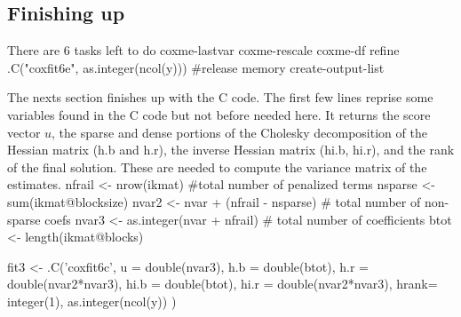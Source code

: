 \documentclass{article}
\begin{document}
\subsection{Finishing up}
\label{sect:final}
There are 6 tasks left to do
\nwenddocs{}\endmoddef
\LA{}coxme-lastvar\RA{}
\LA{}coxme-rescale\RA{}
\LA{}coxme-df\RA{}
\LA{}refine\RA{}  
.C("coxfit6e", as.integer(ncol(y)))  #release memory
\LA{}create-output-list\RA{}
\nwendcode{}\nwdocspar

The nexts section finishes up with the C code.
The first few lines reprise some variables
found in the C code but not before needed here.
It returns the score vector $u$, the 
sparse and dense portions of the Cholesky decomposition of the
Hessian matrix (h.b and h.r), the
inverse Hessian matrix (hi.b, hi.r), and the rank of the final 
solution.  These are needed to compute the variance matrix of the
estimates.
\nwenddocs{}\endmoddef
nfrail <- nrow(ikmat)  #total number of penalized terms
nsparse <- sum(ikmat@blocksize)
nvar2  <- nvar + (nfrail - nsparse)  # total number of non-sparse coefs
nvar3  <- as.integer(nvar + nfrail)  # total number of coefficients
btot   <- length(ikmat@blocks)

fit3 <- .C('coxfit6c',
               u    = double(nvar3),
               h.b  = double(btot),
               h.r  = double(nvar2*nvar3),
               hi.b = double(btot),
               hi.r = double(nvar2*nvar3),
               hrank= integer(1),
               as.integer(ncol(y))
               )
\nwendcode{}\nwdocspar
\end{document}
